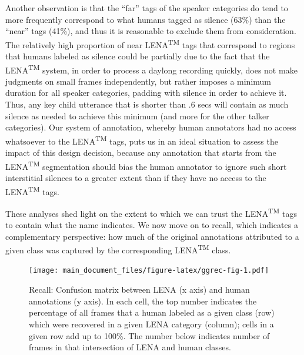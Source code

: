 \documentclass[english,floatsintext,man]{apa6}
\begin{document}
Another observation is that the \enquote{far} tags of the speaker
categories do tend to more frequently correspond to what humans tagged
as silence (63\%) than the \enquote{near} tags (41\%), and thus it is
reasonable to exclude them from consideration. The relatively high
proportion of near LENA\textsuperscript{TM} tags that correspond to
regions that humans labeled as silence could be partially due to the
fact that the LENA\textsuperscript{TM} system, in order to process a
daylong recording quickly, does not make judgments on small frames
independently, but rather imposes a minimum duration for all speaker
categories, padding with silence in order to achieve it. Thus, any key
child utterance that is shorter than .6 secs will contain as much
silence as needed to achieve this minimum (and more for the other talker
categories). Our system of annotation, whereby human annotators had no
access whatsoever to the LENA\textsuperscript{TM} tags, puts us in an
ideal situation to assess the impact of this design decision, because
any annotation that starts from the LENA\textsuperscript{TM}
segmentation should bias the human annotator to ignore such short
interstitial silences to a greater extent than if they have no access to
the LENA\textsuperscript{TM} tags.

These analyses shed light on the extent to which we can trust the
LENA\textsuperscript{TM} tags to contain what the name indicates. We now
move on to recall, which indicates a complementary perspective: how much
of the original annotations attributed to a given class was captured by
the corresponding LENA\textsuperscript{TM} class.

\begin{figure}
\centering
\texttt{[image: main\_document\_files/figure-latex/ggrec-fig-1.pdf]}
\caption{\label{fig:ggrec-fig}Recall: Confusion matrix between LENA (x axis)
and human annotations (y axis). In each cell, the top number indicates
the percentage of all frames that a human labeled as a given class (row)
which were recovered in a given LENA category (column); cells in a given
row add up to 100\%. The number below indicates number of frames in that
intersection of LENA and human classes.}
\end{figure}
\end{document}
